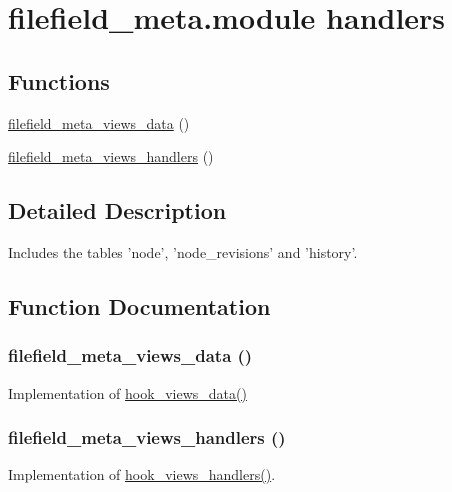 \hypertarget{group__views__filefield__meta__module}{
\section{filefield\_\-meta.module handlers}
\label{group__views__filefield__meta__module}
}
\subsection*{Functions}
\begin{CompactItemize}
\item 
\hyperlink{group__views__filefield__meta__module_g3536b66b031e4b5d07f14859e769ea45}{filefield\_\-meta\_\-views\_\-data} ()
\item 
\hyperlink{group__views__filefield__meta__module_g30b239ece7653738ac7c53d667855ee4}{filefield\_\-meta\_\-views\_\-handlers} ()
\end{CompactItemize}


\subsection{Detailed Description}
Includes the tables 'node', 'node\_\-revisions' and 'history'. 

\subsection{Function Documentation}
\hypertarget{group__views__filefield__meta__module_g3536b66b031e4b5d07f14859e769ea45}{
\subsubsection[{filefield\_\-meta\_\-views\_\-data}]{\setlength{\rightskip}{0pt plus 5cm}filefield\_\-meta\_\-views\_\-data ()}}
\label{group__views__filefield__meta__module_g3536b66b031e4b5d07f14859e769ea45}


Implementation of \hyperlink{group__views__hooks_g227057901681e4a33e33c199c7a8c989}{hook\_\-views\_\-data()} \hypertarget{group__views__filefield__meta__module_g30b239ece7653738ac7c53d667855ee4}{
\subsubsection[{filefield\_\-meta\_\-views\_\-handlers}]{\setlength{\rightskip}{0pt plus 5cm}filefield\_\-meta\_\-views\_\-handlers ()}}
\label{group__views__filefield__meta__module_g30b239ece7653738ac7c53d667855ee4}


Implementation of \hyperlink{group__views__hooks_gbf506f44bd8d8a86876f27396f5341ed}{hook\_\-views\_\-handlers()}. 